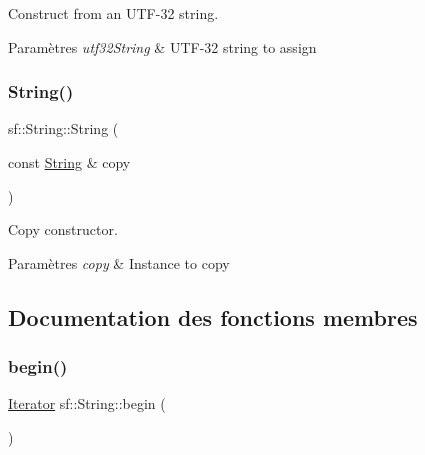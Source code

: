 Construct from an U\+T\+F-\/32 string. 


\begin{DoxyParams}{Paramètres}
{\em utf32\+String} & U\+T\+F-\/32 string to assign \\
\hline
\end{DoxyParams}
\mbox{\label{classsf_1_1String_af862594d3c4070d8ddbf08cf8dce4f59}} 
\subsubsection{\texorpdfstring{String()}{String()}\hspace{0.1cm}{\footnotesize\ttfamily [11/11]}}
{\footnotesize\ttfamily sf\+::\+String\+::\+String (\begin{DoxyParamCaption}\item[{const \hyperlink{classsf_1_1String}{String} \&}]{copy }\end{DoxyParamCaption})}



Copy constructor. 


\begin{DoxyParams}{Paramètres}
{\em copy} & Instance to copy \\
\hline
\end{DoxyParams}


\subsection{Documentation des fonctions membres}
\mbox{\label{classsf_1_1String_a8ec30ddc08e3a6bd11c99aed782f6dfe}} 
\subsubsection{\texorpdfstring{begin()}{begin()}\hspace{0.1cm}{\footnotesize\ttfamily [1/2]}}
{\footnotesize\ttfamily \hyperlink{classsf_1_1String_ac90f2b7b28f703020f8d027e98806235}{Iterator} sf\+::\+String\+::begin (\begin{DoxyParamCaption}{ }\end{DoxyParamCaption})}



